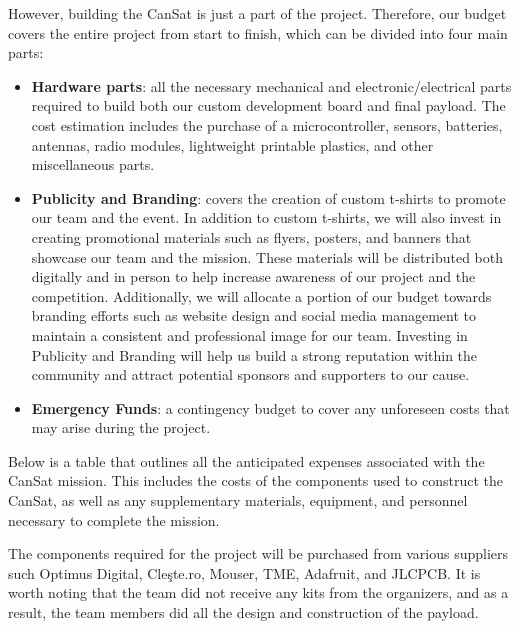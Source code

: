 However, building the CanSat is just a part of the project. Therefore, our budget covers the entire project from start to finish, which can be divided into four main parts: 
\begin{itemize}[leftmargin=1cm, itemindent=0.25cm, noitemsep, topsep=0pt, label=$\bullet$]
    \item \textbf{Hardware parts}: all the necessary mechanical and electronic/electrical parts required to build both our custom development board and final payload. The cost estimation includes the purchase of a microcontroller, sensors, batteries, antennas, radio modules, lightweight printable plastics, and other miscellaneous parts.
    \item \textbf{Publicity and Branding}: covers the creation of custom t-shirts to promote our team and the event. In addition to custom t-shirts, we will also invest in creating promotional materials such as flyers, posters, and banners that showcase our team and the mission. These materials will be distributed both digitally and in person to help increase awareness of our project and the competition. Additionally, we will allocate a portion of our budget towards branding efforts such as website design and social media management to maintain a consistent and professional image for our team. Investing in Publicity and Branding will help us build a strong reputation within the community and attract potential sponsors and supporters to our cause.
    \item \textbf{Emergency Funds}: a contingency budget to cover any unforeseen costs that may arise during the project.
\end{itemize}

Below is a table that outlines all the anticipated expenses associated with the CanSat mission. This includes the costs of the components used to construct the CanSat, as well as any supplementary materials, equipment, and personnel necessary to complete the mission.

The components required for the project will be purchased from various suppliers such Optimus Digital, Cle\c{s}te.ro, Mouser, TME, Adafruit, and JLCPCB. It is worth noting that the team did not receive any kits from the organizers, and as a result, the team members did all the design and construction of the payload.

